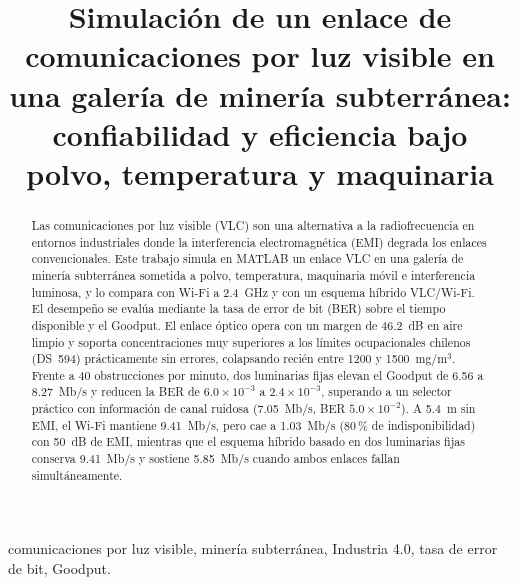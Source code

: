 \documentclass[conference]{IEEEtran}
\begin{document}
\title{Simulación de un enlace de comunicaciones por luz visible en una galería de minería subterránea: confiabilidad y eficiencia bajo polvo, temperatura y maquinaria}

\author{
\and
{}
}

\maketitle

\begin{abstract}
Las comunicaciones por luz visible (VLC) son una alternativa a la radiofrecuencia en entornos industriales donde la interferencia electromagnética (EMI) degrada los enlaces convencionales. Este trabajo simula en MATLAB un enlace VLC en una galería de minería subterránea sometida a polvo, temperatura, maquinaria móvil e interferencia luminosa, y lo compara con Wi-Fi a 2.4~GHz y con un esquema híbrido VLC/Wi-Fi. El desempeño se evalúa mediante la tasa de error de bit (BER) sobre el tiempo disponible y el Goodput. El enlace óptico opera con un margen de 46.2~dB en aire limpio y soporta concentraciones muy superiores a los límites ocupacionales chilenos (DS~594) prácticamente sin errores, colapsando recién entre 1200 y 1500~mg/m$^{3}$. Frente a 40 obstrucciones por minuto, dos luminarias fijas elevan el Goodput de 6.56 a 8.27~Mb/s y reducen la BER de $6.0\times10^{-3}$ a $2.4\times10^{-3}$, superando a un selector práctico con información de canal ruidosa (7.05~Mb/s, BER $5.0\times10^{-2}$). A 5.4~m sin EMI, el Wi-Fi mantiene 9.41~Mb/s, pero cae a 1.03~Mb/s (80\,\% de indisponibilidad) con 50~dB de EMI, mientras que el esquema híbrido basado en dos luminarias fijas conserva 9.41~Mb/s y sostiene 5.85~Mb/s cuando ambos enlaces fallan simultáneamente.
\end{abstract}

\begin{IEEEkeywords}
comunicaciones por luz visible, minería subterránea, Industria 4.0, tasa de error de bit, Goodput.
\end{IEEEkeywords}
\end{document}
